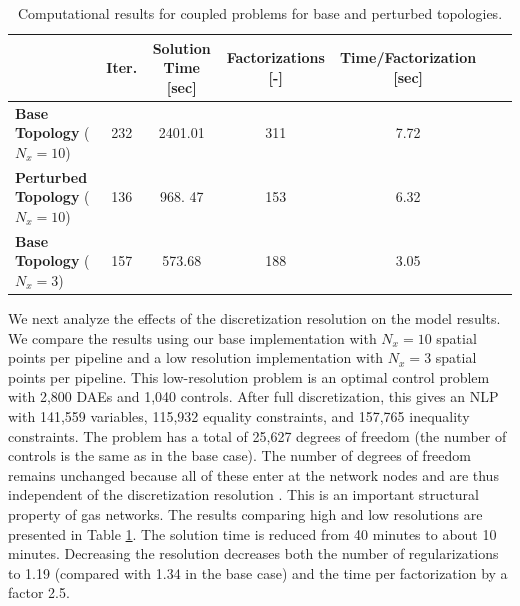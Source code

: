 \documentclass[11pt,twoside]{article}
\begin{document}
\begin{table}[htp]
\small
\caption{Computational results for coupled problems for base and perturbed topologies.}
\begin{center}
\begin{tabular}{lcccccc}
                  & Iter. & Solution Time [sec] & Factorizations [-] & Time/Factorization [sec]\\
\hline {\bf Base Topology}  ($N_x=10$)&  232 & 2401.01 & 311 & 7.72\\
{\bf Perturbed Topology} ($N_x=10$)&   136 & 968. 47&  153  & 6.32\\
{\bf Base Topology} ($N_x=3$)&   157 & 573.68&  188   &3.05                      
\end{tabular}
\end{center}
\label{table:compu}
\end{table}%

We next analyze the effects of the discretization resolution on the model results. We compare the results using our base implementation with $N_x=10$ spatial points per pipeline and a low resolution implementation with $N_x=3$ spatial points per pipeline. This low-resolution problem is an optimal control problem with 2,800 DAEs and 1,040 controls. After full discretization, this gives an NLP with 141,559 variables, 115,932 equality constraints, and 157,765 inequality constraints. The problem has a total of 25,627 degrees of freedom (the number of controls is the same as in the base case). The number of degrees of freedom remains unchanged because all of these enter at the network nodes and are thus independent of the discretization resolution \cite{zavalastochgas}. This is an important structural property of gas networks. The results comparing high and low resolutions are presented in Table \ref{table:compu}. The solution time is reduced from 40 minutes to about 10 minutes. Decreasing the resolution decreases both the number of regularizations to 1.19 (compared with 1.34 in the base case) and the time per factorization by a factor 2.5.  
\end{document}
